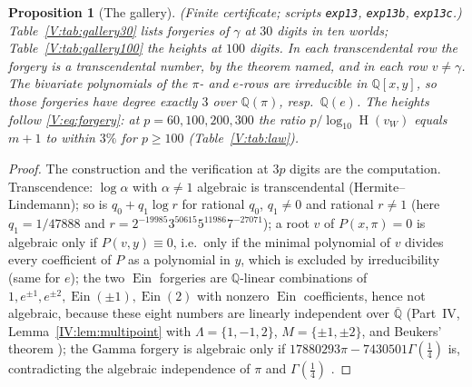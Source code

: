 \documentclass[11pt,a4paper]{article}
\newcommand{\Q}{\mathbb Q}
\newcommand{\Qbar}{\overline{\mathbb Q}}
\newcommand{\Ein}{\operatorname{Ein}}
\DeclareMathOperator{\Ht}{H}
\newtheorem{proposition}[theorem]{Proposition}
\theoremstyle{definition}
\theoremstyle{remark}
\numberwithin{equation}{section}
\begin{document}
\begin{proposition}[The gallery]\label{V:prop:gallery}
\textup{(Finite certificate; scripts \texttt{exp13}, \texttt{exp13b}, \texttt{exp13c}.)}
Table~\ref{V:tab:gallery30} lists forgeries of $\gamma$ at $30$ digits in ten worlds;
Table~\ref{V:tab:gallery100} the heights at $100$ digits. In each transcendental row the
forgery is a transcendental number, by the theorem named, and in each row $v\ne\gamma$. The
bivariate polynomials of the $\pi$- and $e$-rows are irreducible in $\Q[x,y]$, so those
forgeries have degree exactly $3$ over $\Q(\pi)$, resp.\ $\Q(e)$. The heights follow
\eqref{V:eq:forgery}: at $p=60,100,200,300$ the ratio $p/\log_{10}\Ht(v_W)$ equals $m+1$ to
within $3\%$ for $p\ge100$ (Table~\ref{V:tab:law}).
\end{proposition}
\begin{proof}
The construction and the verification at $3p$ digits are the computation. Transcendence:
$\log\alpha$ with $\alpha\ne1$ algebraic is transcendental (Hermite--Lindemann);
so is $q_0+q_1\log r$ for rational $q_0$, $q_1\ne0$ and rational $r\ne1$ (here
$q_1=1/47888$ and $r=2^{-19985}3^{50615}5^{11986}7^{-27071}$);
a root $v$ of $P(x,\pi)=0$ is algebraic only if $P(v,y)\equiv0$, i.e.\ only if the minimal
polynomial of $v$ divides every coefficient of $P$ as a polynomial in $y$, which is excluded
by irreducibility (same for $e$); the two $\Ein$ forgeries are $\Q$-linear combinations of
$1,e^{\pm1},e^{\pm2},\Ein(\pm1),\Ein(2)$ with nonzero $\Ein$ coefficients, hence not
algebraic, because these eight numbers are linearly independent over $\Qbar$ (Part~IV,
Lemma~\ref{IV:lem:multipoint} with $\Lambda=\{1,-1,2\}$, $M=\{\pm1,\pm2\}$, and Beukers' theorem
\cite{Beukers}); the Gamma forgery is algebraic only if $17880293\pi-7430501\Gamma(\tfrac14)$
is, contradicting the algebraic independence of $\pi$ and $\Gamma(\tfrac14)$ \cite{Chudnovsky}.
\end{proof}
\end{document}

